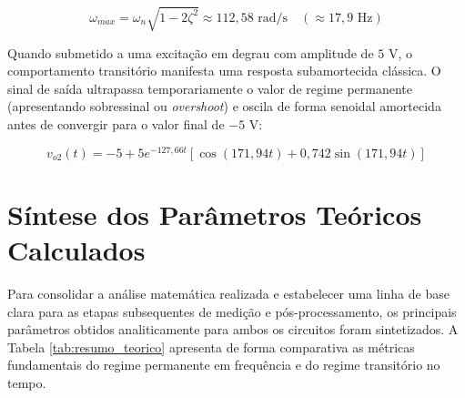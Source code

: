 \begin{equation}
	\omega_{max} = \omega_n \sqrt{1 - 2\zeta^2} \approx 112,58\text{ rad/s} \quad (\approx 17,9\text{ Hz})
\end{equation}

Quando submetido a uma excitação em degrau com amplitude de $5\text{ V}$, o comportamento transitório manifesta uma resposta subamortecida clássica. O sinal de saída ultrapassa temporariamente o valor de regime permanente (apresentando sobressinal ou \textit{overshoot}) e oscila de forma senoidal amortecida antes de convergir para o valor final de $-5\text{ V}$:

\begin{equation}
	v_{o2}(t) = -5 + 5e^{-127,66t} \left[ \cos(171,94t) + 0,742\sin(171,94t) \right]
\end{equation}

\section{Síntese dos Parâmetros Teóricos Calculados}

Para consolidar a análise matemática realizada e estabelecer uma linha de base clara para as etapas subsequentes de medição e pós-processamento, os principais parâmetros obtidos analiticamente para ambos os circuitos foram sintetizados. A Tabela \ref{tab:resumo_teorico} apresenta de forma comparativa as métricas fundamentais do regime permanente em frequência e do regime transitório no tempo.

